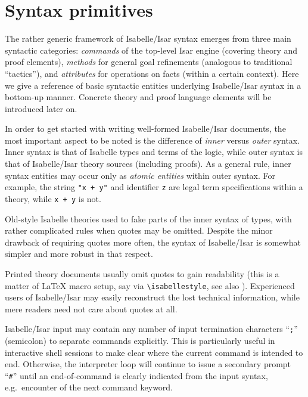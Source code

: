 
\chapter{Syntax primitives}

The rather generic framework of Isabelle/Isar syntax emerges from three main
syntactic categories: \emph{commands} of the top-level Isar engine (covering
theory and proof elements), \emph{methods} for general goal refinements
(analogous to traditional ``tactics''), and \emph{attributes} for operations
on facts (within a certain context).  Here we give a reference of basic
syntactic entities underlying Isabelle/Isar syntax in a bottom-up manner.
Concrete theory and proof language elements will be introduced later on.

\medskip

In order to get started with writing well-formed Isabelle/Isar documents, the
most important aspect to be noted is the difference of \emph{inner} versus
\emph{outer} syntax.  Inner syntax is that of Isabelle types and terms of the
logic, while outer syntax is that of Isabelle/Isar theory sources (including
proofs).  As a general rule, inner syntax entities may occur only as
\emph{atomic entities} within outer syntax.  For example, the string
\texttt{"x + y"} and identifier \texttt{z} are legal term specifications
within a theory, while \texttt{x + y} is not.

\begin{warn}
  Old-style Isabelle theories used to fake parts of the inner syntax of types,
  with rather complicated rules when quotes may be omitted.  Despite the minor
  drawback of requiring quotes more often, the syntax of Isabelle/Isar is
  somewhat simpler and more robust in that respect.
\end{warn}

Printed theory documents usually omit quotes to gain readability (this is a
matter of {\LaTeX} macro setup, say via \verb,\isabellestyle,, see also
\cite{isabelle-sys}).  Experienced users of Isabelle/Isar may easily
reconstruct the lost technical information, while mere readers need not care
about quotes at all.

\medskip

Isabelle/Isar input may contain any number of input termination characters
``\texttt{;}'' (semicolon) to separate commands explicitly.  This is
particularly useful in interactive shell sessions to make clear where the
current command is intended to end.  Otherwise, the interpreter loop will
continue to issue a secondary prompt ``\verb,#,'' until an end-of-command is
clearly indicated from the input syntax, e.g.\ encounter of the next command
keyword.

